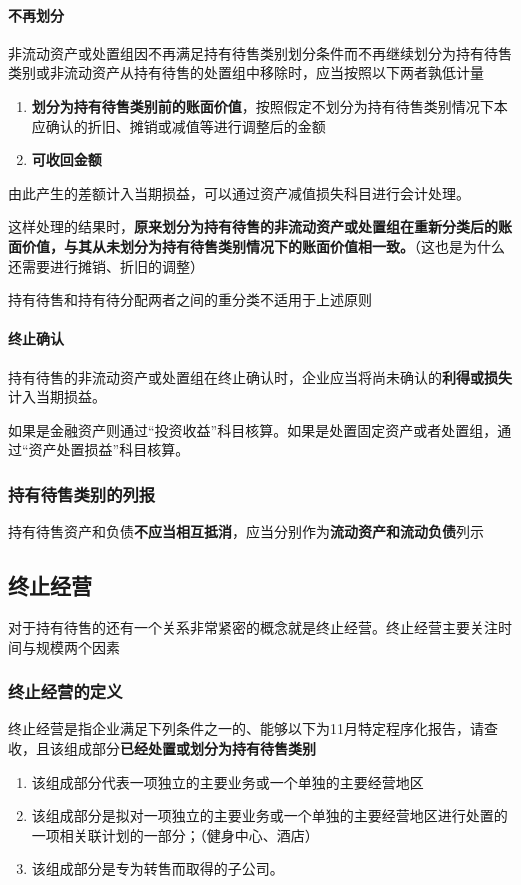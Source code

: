 \documentclass[UTF8,12pt]{ctexart}
\numberwithin{equation}{section} %
\numberwithin{figure}{section}
\numberwithin{table}{section}
\begin{document}
	\paragraph{不再划分}
	非流动资产或处置组因不再满足持有待售类别划分条件而不再继续划分为持有待售类别或非流动资产从持有待售的处置组中移除时，应当按照以下两者孰低计量
	\begin{enumerate}
		\item \textbf{划分为持有待售类别前的账面价值}，按照假定不划分为持有待售类别情况下本应确认的折旧、摊销或减值等进行调整后的金额
		
		\item \textbf{可收回金额}
	\end{enumerate}
	由此产生的差额计入当期损益，可以通过资产减值损失科目进行会计处理。
	
	这样处理的结果时，\textbf{原来划分为持有待售的非流动资产或处置组在重新分类后的账面价值，与其从未划分为持有待售类别情况下的账面价值相一致。}（这也是为什么还需要进行摊销、折旧的调整）
	
	持有待售和持有待分配两者之间的重分类不适用于上述原则
	
	\paragraph{终止确认}
	持有待售的非流动资产或处置组在终止确认时，企业应当将尚未确认的\textbf{利得或损失}计入当期损益。
	
	如果是金融资产则通过“投资收益”科目核算。如果是处置固定资产或者处置组，通过“资产处置损益”科目核算。
	
	\subsubsection{持有待售类别的列报}
	持有待售资产和负债\textbf{不应当相互抵消}，应当分别作为\textbf{流动资产和流动负债}列示
	
	
	\subsection{终止经营}
	对于持有待售的还有一个关系非常紧密的概念就是终止经营。终止经营主要关注时间与规模两个因素
	
	\subsubsection{终止经营的定义}
	终止经营是指企业满足下列条件之一的、能够以下为11月特定程序化报告，请查收，且该组成部分\textbf{已经处置或划分为持有待售类别}
	\begin{enumerate}
		\item 该组成部分代表一项独立的主要业务或一个单独的主要经营地区
		
		\item 该组成部分是拟对一项独立的主要业务或一个单独的主要经营地区进行处置的一项相关联计划的一部分；（健身中心、酒店）
		
		\item 该组成部分是专为转售而取得的子公司。
	\end{enumerate}
	
\end{document}

